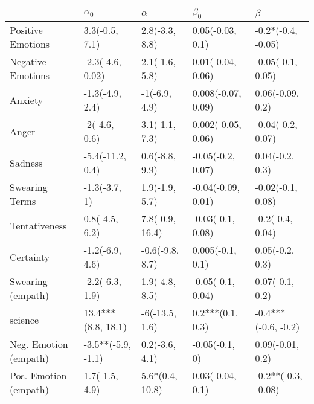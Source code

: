\begin{tabular}{lllll}
\toprule
{} &          $\alpha_0$ &         $\alpha$ &           $\beta_0$ &              $\beta$ \\
\midrule
Positive Emotions     &      3.3(-0.5, 7.1) &   2.8(-3.3, 8.8) &    0.05(-0.03, 0.1) &   -0.2*(-0.4, -0.05) \\
Negative Emotions     &    -2.3(-4.6, 0.02) &   2.1(-1.6, 5.8) &   0.01(-0.04, 0.06) &    -0.05(-0.1, 0.05) \\
Anxiety               &     -1.3(-4.9, 2.4) &    -1(-6.9, 4.9) &  0.008(-0.07, 0.09) &     0.06(-0.09, 0.2) \\
Anger                 &       -2(-4.6, 0.6) &   3.1(-1.1, 7.3) &  0.002(-0.05, 0.06) &    -0.04(-0.2, 0.07) \\
Sadness               &    -5.4(-11.2, 0.4) &   0.6(-8.8, 9.9) &   -0.05(-0.2, 0.07) &      0.04(-0.2, 0.3) \\
Swearing Terms        &       -1.3(-3.7, 1) &   1.9(-1.9, 5.7) &  -0.04(-0.09, 0.01) &    -0.02(-0.1, 0.08) \\
Tentativeness         &      0.8(-4.5, 6.2) &  7.8(-0.9, 16.4) &   -0.03(-0.1, 0.08) &     -0.2(-0.4, 0.04) \\
Certainty             &     -1.2(-6.9, 4.6) &  -0.6(-9.8, 8.7) &    0.005(-0.1, 0.1) &      0.05(-0.2, 0.3) \\
Swearing (empath)     &     -2.2(-6.3, 1.9) &   1.9(-4.8, 8.5) &   -0.05(-0.1, 0.04) &      0.07(-0.1, 0.2) \\
science               &  13.4***(8.8, 18.1) &   -6(-13.5, 1.6) &    0.2***(0.1, 0.3) &  -0.4***(-0.6, -0.2) \\
Neg. Emotion (empath) &  -3.5**(-5.9, -1.1) &   0.2(-3.6, 4.1) &      -0.05(-0.1, 0) &     0.09(-0.01, 0.2) \\
Pos. Emotion (empath) &      1.7(-1.5, 4.9) &  5.6*(0.4, 10.8) &    0.03(-0.04, 0.1) &  -0.2**(-0.3, -0.08) \\
\bottomrule
\end{tabular}
